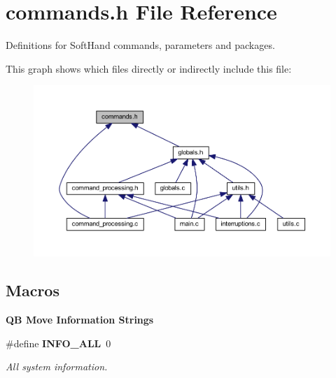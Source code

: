 \section{commands.\+h File Reference}
\label{commands_8h}


Definitions for Soft\+Hand commands, parameters and packages.  


This graph shows which files directly or indirectly include this file\+:\nopagebreak
\begin{figure}[H]
\begin{center}
\leavevmode
\includegraphics[width=350pt]{commands_8h__dep__incl}
\end{center}
\end{figure}
\subsection*{Macros}
\begin{Indent}\textbf{ QB Move Information Strings}\par
\begin{DoxyCompactItemize}
\item 
\mbox{\label{commands_8h_a2ba44fc5b8a316bd307d0baa9ab629ef}} 
\#define \textbf{ I\+N\+F\+O\+\_\+\+A\+LL}~0
\begin{DoxyCompactList}\small\item\em All system information. \end{DoxyCompactList}\end{DoxyCompactItemize}
\end{Indent}
